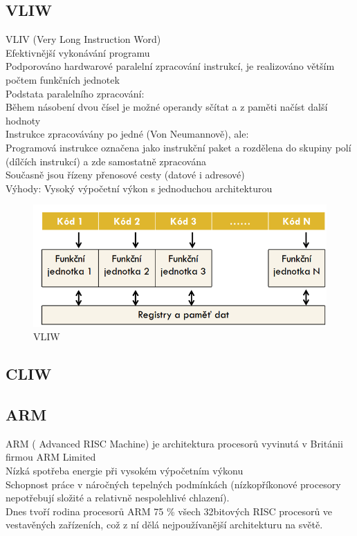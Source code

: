 \subsection{VLIW}
VLIV (Very Long Instruction Word)\\
Efektivnější vykonávání programu\\
Podporováno hardwarové paralelní zpracování instrukcí, je realizováno větším počtem funkčních jednotek\\
Podstata paralelního zpracování:\\
Během násobení dvou čísel je možné operandy sčítat a z paměti načíst další hodnoty\\

Instrukce zpracovávány po jedné (Von Neumannově), ale:\\
Programová instrukce označena jako instrukční paket a rozdělena
do skupiny polí (dílčích instrukcí) a zde samostatně zpracována\\
Současně jsou řízeny přenosové cesty (datové i adresové)\\
Výhody: Vysoký výpočetní výkon s jednoduchou architekturou\\
    \begin{figure}[h]
   \begin{center}
     \includegraphics[scale=0.5]{images/VLIW.png}
   \end{center}
   \caption{VLIW}
  \end{figure}

\subsection{CLIW}
\subsection{ARM}
ARM ( Advanced RISC Machine) je architektura procesorů vyvinutá v Británii firmou ARM Limited\\
Nízká spotřeba energie při vysokém výpočetním výkonu\\
Schopnost práce v náročných tepelných podmínkách (nízkopříkonové procesory nepotřebují složité a relativně nespolehlivé chlazení).\\
Dnes tvoří rodina procesorů ARM 75 \% všech 32bitových RISC procesorů ve vestavěných zařízeních, což z ní dělá nejpoužívanější architekturu na světě.\\


